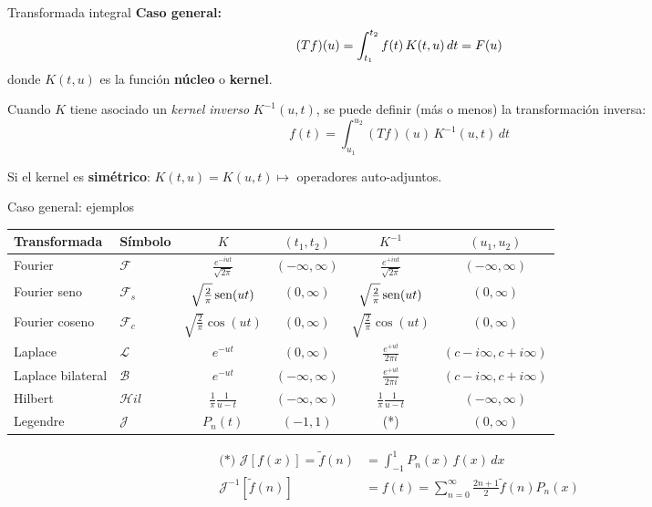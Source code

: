 \documentclass[9pt, aspectratio=169]{beamer}
\begin{document}
\begin{frame}{Transformada integral}
\textbf{Caso general:}
\[ (Tf)(u) = \int_{t_1}^{t_2} f(t) \, K(t, u) \, dt \\ = F(u) \]
donde $K(t, u)$ es la función \textbf{núcleo} o \textbf{kernel}.

Cuando $K$ tiene asociado un \textit{kernel inverso} $K^{-1}(u, t)$, se puede definir (más o menos) la transformación inversa:
\[ f(t) = \int_{u_1}^{u_2} (Tf)(u) \, K^{-1}(u, t) \, dt \]

Si el kernel es \textbf{simétrico}: $K(t, u) = K(u, t) \mapsto$ operadores auto-adjuntos.

\end{frame}

\begin{frame}{Caso general: ejemplos}

\begin{center}
\begin{tabular}{llcccc}
\toprule
\textbf{Transformada} & \textbf{Símbolo} & $K$ & $(t_1, t_2)$ &  $K^{-1}$ & $(u_1, u_2)$ \\
\midrule
Fourier & $\mathscr{F}$ & $\frac{e^{-iut}}{\sqrt{2 \pi}}$ & $(-\infty, \infty)$ & $\frac{e^{+iut}}{\sqrt{2 \pi}}$ & $(-\infty, \infty)$ \\
Fourier seno & $\mathscr{F}_s$ & $\sqrt{\frac{2}{\pi}} \operatorname{sen}(ut)$ & $(0, \infty)$ & $\sqrt{\frac{2}{\pi}} \operatorname{sen}(ut)$ & $(0, \infty)$ \\
Fourier coseno & $\mathscr{F}_c$ & $\sqrt{\frac{2}{\pi}} \cos(ut)$ & $(0, \infty)$ & $\sqrt{\frac{2}{\pi}} \cos(ut)$ & $(0, \infty)$ \\
Laplace & $\mathscr{L}$ & $e^{-ut}$ & $(0, \infty)$ & $\frac{e^{+ut}}{2 \pi i}$ & $(c-i\infty, c+i\infty)$ \\
Laplace bilateral & $\mathscr{B}$ & $e^{-ut}$ & $(-\infty, \infty)$ & $\frac{e^{+ut}}{2 \pi i}$ & $(c-i\infty, c+i\infty)$ \\
Hilbert & $\mathcal{H}il$ & $\frac{1}{\pi} \frac{1}{u-t}$ & $(-\infty, \infty)$ &  $\frac{1}{\pi} \frac{1}{u-t}$ & $(-\infty, \infty)$ \\
Legendre & $\mathcal{J}$ & $P_n(t)$ & $(-1, 1)$ & (*) & $(0, \infty)$ \\
\bottomrule
\end{tabular}
\end{center}
\begin{align*}
    \text{(*) }\mathcal{J}[f(x)] = \tilde{f}(n) &= \int_{-1}^{1} P_n(x) \, f(x) \, dx \\
\mathcal{J}^{-1}[\tilde{f}(n)]  &= f(t) = \sum_{n = 0}^{\infty} \frac{2 n + 1}{2} \tilde{f}(n) P_n(x) 
\end{align*}
\end{frame}
\end{document}
